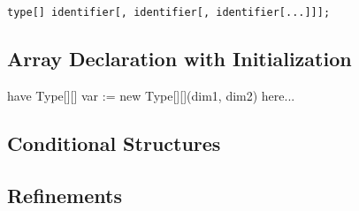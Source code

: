 \begin{lstlisting}
type[] identifier[, identifier[, identifier[...]]];
\end{lstlisting}

\subsection{Array Declaration with Initialization}

have Type[][] var := new Type[][](dim1, dim2) here...

\subsection{Conditional Structures}

\subsection{Refinements}